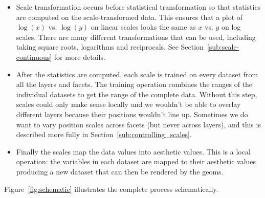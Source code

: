 \begin{itemize}
  \item Scale transformation occurs before statistical transformation so that statistics are computed on the scale-transformed data.  This ensures that a plot of $\log(x)$ vs. $\log(y)$ on linear scales looks the same as $x$ vs. $y$ on log scales. There are many different transformations that can be used, including taking square roots, logarithms and reciprocals. See Section~\ref{sub:scale-continuous} for more details. 
  
  \item After the statistics are computed, each scale is trained on every dataset from all the layers and facets.  The training operation combines the ranges of the individual datasets to get the range of the complete data.  Without this step, scales could only make sense locally and we wouldn't be able to overlay different layers because their positions wouldn't line up.  Sometimes we do want to vary position scales across facets (but never across layers), and this is described more fully in Section~\ref{sub:controlling_scales}.
  
  \item Finally the scales map the data values into aesthetic values.  This is a local operation: the variables in each dataset are mapped to their aesthetic values producing a new dataset that can then be rendered by the geoms.
  
\end{itemize}

Figure~\ref{fig:schematic} illustrates the complete process schematically.

